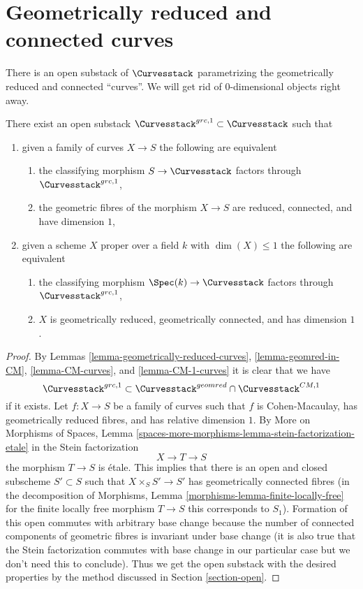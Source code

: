 \section{Geometrically reduced and connected curves}
\label{section-geometrically-reduced-connected}

\noindent
There is an open substack of $\Curvesstack$ parametrizing
the geometrically reduced and connected ``curves''.
We will get rid of $0$-dimensional objects right away.

\begin{lemma}
\label{lemma-geometrically-reduced-connected-1-curves}
There exist an open substack $\Curvesstack^{grc, 1} \subset \Curvesstack$
such that
\begin{enumerate}
\item given a family of curves $X \to S$ the following are equivalent
\begin{enumerate}
\item the classifying morphism $S \to \Curvesstack$ factors
through $\Curvesstack^{grc, 1}$,
\item the geometric fibres of the morphism $X \to S$ are
reduced, connected, and have dimension $1$,
\end{enumerate}
\item given a scheme $X$ proper over a field $k$ with $\dim(X) \leq 1$
the following are equivalent
\begin{enumerate}
\item the classifying morphism $\Spec(k) \to \Curvesstack$ factors
through $\Curvesstack^{grc, 1}$,
\item $X$ is geometrically reduced, geometrically connected,
and has dimension $1$.
\end{enumerate}
\end{enumerate}
\end{lemma}

\begin{proof}
By Lemmas \ref{lemma-geometrically-reduced-curves},
\ref{lemma-geomred-in-CM}, \ref{lemma-CM-curves}, and \ref{lemma-CM-1-curves}
it is clear that we have
$$
\Curvesstack^{grc, 1}
\subset
\Curvesstack^{geomred} \cap \Curvesstack^{CM, 1}
$$
if it exists. Let $f : X \to S$ be a family of curves such that $f$ is
Cohen-Macaulay, has geometrically reduced fibres, and
has relative dimension $1$. By
More on Morphisms of Spaces, Lemma
\ref{spaces-more-morphisms-lemma-stein-factorization-etale}
in the Stein factorization
$$
X \to T \to S
$$
the morphism $T \to S$ is \'etale. This implies that
there is an open and closed subscheme $S' \subset S$
such that $X \times_S S' \to S'$ has geometrically
connected fibres (in the decomposition of
Morphisms, Lemma \ref{morphisms-lemma-finite-locally-free}
for the finite locally free morphism $T \to S$
this corresponds to $S_1$).
Formation of this open commutes with arbitrary base change
because the number of connected components of geometric
fibres is invariant under base change (it is also true
that the Stein factorization commutes with base change
in our particular case but we don't need this to conclude).
Thus we get the open substack with the desired properties
by the method discussed in Section \ref{section-open}.
\end{proof}

